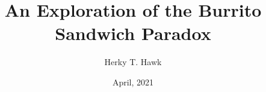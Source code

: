 \documentclass{uithesis}
\title{An Exploration of the Burrito Sandwich Paradox}
\author{Herky T. Hawk}
\date{April, 2021}
\begin{document}
\titlepage
\end{document}
